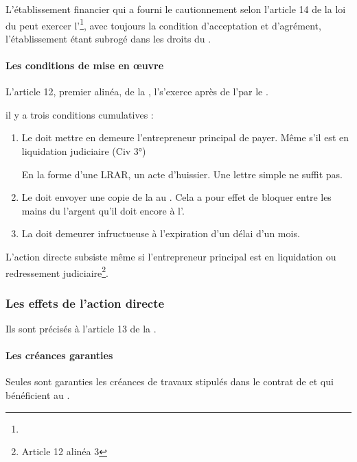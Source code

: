 				L’établissement financier qui a fourni le cautionnement selon l’article 14 de la loi du  peut exercer l'\AD\footnote{}, avec toujours la condition d’acceptation et d’agrément, l’établissement étant subrogé dans les droits du \ST.



			\paragraph{Les conditions de mise en œuvre}

				L'article 12, premier alinéa, de la \loiST, l'\AD s'exerce après \MED de l’\ep par le \ST.

				il y a trois conditions cumulatives :

				\begin{enumerate}
					\item Le \ST doit mettre en demeure l’entrepreneur principal de payer. Même s’il est en liquidation judiciaire (Civ 3°)
\aVerifier

					En la forme d’une LRAR, un acte d’huissier. Une lettre simple ne suffit pas.

					\item Le \ST doit envoyer une copie de la \MED au \MO. Cela a pour effet de bloquer entre les mains du \MO l’argent qu’il doit encore à l’\ep.

					\item La \MED doit demeurer infructueuse à l’expiration d’un délai d’un mois.
				\end{enumerate}

				L’action directe subsiste même si l’entrepreneur principal est en liquidation ou redressement judiciaire\footnote{Article 12 alinéa 3}.


		\subsubsection{Les effets de l'action directe}

			Ils sont précisés à l’article 13 de la \loiST.

			\paragraph{Les créances garanties}

				Seules sont garanties les créances de travaux stipulés dans le contrat de \ST et qui bénéficient au \MO.


